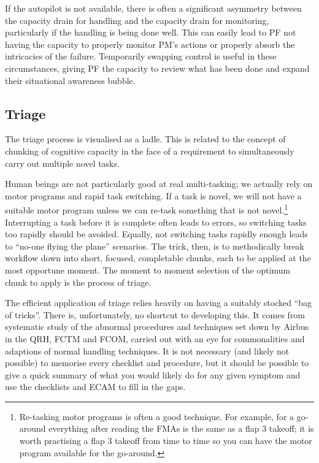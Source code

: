 \documentclass[a5paper,11pt,titlepage]{article}
\begin{document}
If the autopilot is not available, there is often a significant
asymmetry between the capacity drain for handling and the capacity drain
for monitoring, particularly if the handling is being done well. This
can easily lead to PF not having the capacity to properly monitor PM's
actions or properly absorb the intricacies of the failure. Temporarily
swapping control is useful in these circumstances, giving PF the
capacity to review what has been done and expand their situational
awareness bubble.

\subsection{Triage}
The triage process is visualised as a ladle. This is related to the
concept of chunking of cognitive capacity in the face of a requirement
to simultaneously carry out multiple novel tasks.

Human beings are not particularly good at real multi-tasking; we
actually rely on motor programs and rapid task switching. If a task is
novel, we will not have a suitable motor program unless we can re-task
something that is not novel.\footnote{Re-tasking motor programs is often a good technique. For
  example, for a go-around everything after reading the FMAs is the same
  as a flap 3 takeoff; it is worth practising a flap 3 takeoff from time
  to time so you can have the motor program available for the
  go-around.} Interrupting a task before it is complete often leads to
errors, so switching tasks too rapidly should be avoided. Equally, not
switching tasks rapidly enough leads to ``no-one flying the plane''
scenarios. The trick, then, is to methodically break workflow down into
short, focused, completable chunks, each to be applied at the most
opportune moment. The moment to moment selection of the optimum chunk to
apply is the process of triage.

The efficient application of triage relies heavily on having a suitably
stocked ``bag of tricks''. There is, unfortunately, no shortcut to
developing this. It comes from systematic study of the abnormal
procedures and techniques set down by Airbus in the QRH, FCTM and FCOM,
carried out with an eye for commonalities and adaptions of normal
handling techniques. It is not necessary (and likely not possible) to
memorise every checklist and procedure, but it should be possible to
give a quick summary of what you would likely do for any given symptom
and use the checklists and ECAM to fill in the gaps.
\end{document}
